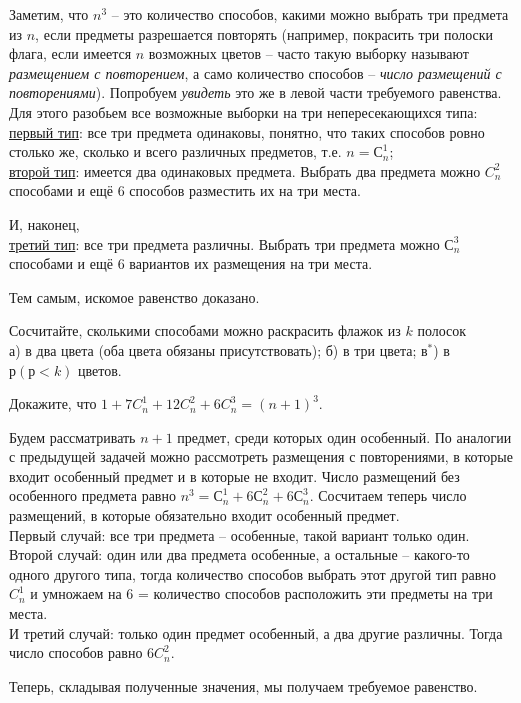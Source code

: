 \begin{prf}
    Заметим, что $n^3$ – это количество способов, какими можно выбрать три предмета из $n$, если
предметы разрешается повторять (например, покрасить три полоски флага, если имеется $n$ возможных цветов – часто такую выборку называют \textit{размещением с повторением}, а само количество способов – \textit{число размещений с повторениями}). Попробуем \textit{увидеть} это же в левой части требуемого равенства. Для этого разобьем все возможные выборки на три непересекающихся типа: 
\\ \underline{первый тип}: все три предмета одинаковы, понятно, что таких способов ровно столько же, сколько и всего различных предметов, т.е. $n = С^1_n$;
\\ \underline{второй тип}: имеется два одинаковых предмета. Выбрать два предмета можно $C^2_n$ способами и ещё 6 способов разместить их на три места. 
\par И, наконец, 
\\ \underline{третий тип}: все три предмета различны. Выбрать три предмета можно $С^3_n$ способами и ещё 6 вариантов их размещения на три места. 
\par Тем самым, искомое равенство доказано.
\end{prf}

\begin{ex}
    Сосчитайте, сколькими способами можно раскрасить флажок из $k$ полосок 
    \\ а) в два цвета (оба цвета обязаны присутствовать); б) в три цвета; в$^*$) в $р (р < k)$ цветов.
\end{ex}

\begin{thm}
    Докажите, что $1 + 7C^1_n + 12C^2_n + 6C^3_n = (n + 1)^3$.
\end{thm}

\begin{prf}
    Будем рассматривать $n + 1$ предмет, среди которых один особенный. По аналогии с предыдущей задачей можно рассмотреть размещения с повторениями, в которые входит особенный предмет и в которые не входит. Число размещений без особенного предмета равно $n^3 = С^1_n + 6С^2_n + 6С^3_n$. Сосчитаем теперь число размещений, в которые обязательно входит особенный предмет. 
    \\Первый случай: все три предмета –
особенные, такой вариант только один.
\\ Второй случай: один или два предмета особенные, а остальные –
какого-то одного другого типа, тогда количество способов выбрать этот другой тип равно $C^1_n$ и умножаем на
6 = количество способов расположить эти предметы на три места. 
\\ И третий случай: только один предмет
особенный, а два другие различны. Тогда число способов равно $6C^2_n$. 
\par Теперь, складывая полученные
значения, мы получаем требуемое равенство.
\end{prf}

